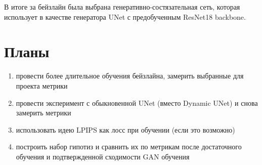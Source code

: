\documentclass[14pt]{article}
\begin{document}
В итоге за бейзлайн была выбрана генеративно-состязательная сеть, которая
использует в качестве генератора UNet с предобученным ResNet18 backbone.

\section{Планы}

\begin{enumerate}
    \item провести более длительное обучения бейзлайна, замерить выбранные для проекта метрики
    \item провести эксперимент с обыкновенной UNet (вместо Dynamic UNet) и снова замерить метрики
    \item использовать идею LPIPS как лосс при обучении (если это возможно)
    \item построить набор гипотиз и сравнить их по метрикам после достаточного обучения и подтвержденной сходимости GAN обучения
\end{enumerate}


\pagebreak
\printbibliography
\end{document}
